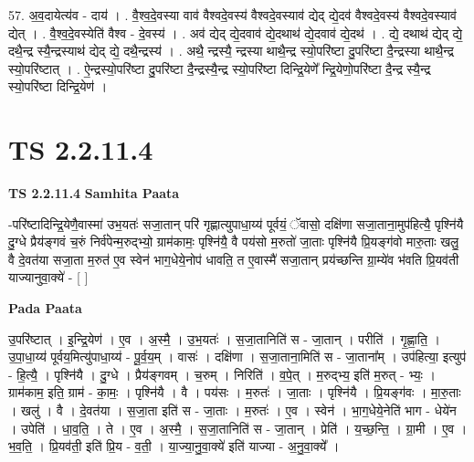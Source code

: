 \documentclass[17pt]{extarticle}
\begin{document}
57. अ॒व॒दायेत्य॑व - दाय॑ । . वै॒श्व॒दे॒वस्या वाव॑ वैश्वदे॒वस्य॑ वैश्वदे॒वस्याव॑ द्येद् द्ये॒दव॑ वैश्वदे॒वस्य॑ वैश्वदे॒वस्याव॑ द्येत् । . वै॒श्व॒दे॒वस्येति॑ वैश्व - दे॒वस्य॑ । . अव॑ द्येद् द्ये॒दवाव॑ द्ये॒दथाथ॑ द्ये॒दवाव॑ द्ये॒दथ॑ । . द्ये॒ दथाथ॑ द्येद् द्ये॒ दथै॒न्द्र स्यै॒न्द्रस्याथ॑ द्येद् द्ये॒ दथै॒न्द्रस्य॑ । . अथै॒ न्द्रस्यै॒ न्द्रस्या थाथै॒न्द्र स्यो॒परि॑ष्टा दु॒परि॑ष्टा दै॒न्द्रस्या थाथै॒न्द्र स्यो॒परि॑ष्टात् । . ऐ॒न्द्रस्यो॒परि॑ष्टा दु॒परि॑ष्टा दै॒न्द्रस्यै॒न्द्र स्यो॒परि॑ष्टा दिन्द्रि॒येणे᳚ न्द्रि॒येणो॒परि॑ष्टा 
दै॒न्द्र स्यै॒न्द्र स्यो॒परि॑ष्टा दिन्द्रि॒येण॑ । \newline
\pagebreak
{}
\section*{ TS 2.2.11.4 }

\textbf{TS 2.2.11.4 } \newline
\textbf{Samhita Paata} \newline

-परि॑ष्टादिन्द्रि॒येणै॒वास्मा॑ उभ॒यतः॑ सजा॒तान् परि॑ गृह्णात्युपाधा॒य्य॑ पूर्वयं॒ ॅवासो॒ दक्षि॑णा सजा॒ताना॒मुप॑हित्यै॒ पृश्नि॑यै दु॒ग्धे प्रैय॑ङ्गवं च॒रुं निर्व॑पेन्म॒रुद्भ्यो॒ ग्राम॑कामः॒ पृश्नि॑यै॒ वै पय॑सो म॒रुतो॑ जा॒ताः पृश्नि॑यै प्रि॒यङ्ग॑वो मारु॒ताः खलु॒ वै दे॒वत॑या सजा॒ता म॒रुत॑ ए॒व स्वेन॑ भाग॒धेये॒नोप॑ धावति॒ त ए॒वास्मै॑ सजा॒तान् प्रय॑च्छन्ति ग्रा॒म्ये॑व भ॑वति प्रि॒यव॑ती याज्यानुवा॒क्ये॑ - [  ] \newline

\textbf{Pada Paata} \newline

उ॒परि॑ष्टात् । इ॒न्द्रि॒येण॑ । ए॒व । अ॒स्मै॒ । उ॒भ॒यतः॑ । स॒जा॒तानिति॑ स - जा॒तान् । परीति॑ । गृ॒ह्णा॒ति॒ । उ॒पा॒धा॒य्य॑ पूर्वय॒मित्यु॑पाधा॒य्य॑ - पू॒र्व॒य॒म् । वासः॑ । दक्षि॑णा । स॒जा॒ताना॒मिति॑ स - जा॒ताना᳚म् । उप॑हित्या॒ इत्युप॑ - हि॒त्यै॒ । पृश्नि॑यै । दु॒ग्धे । प्रैय॑ङ्गवम् । च॒रुम् । निरिति॑ । व॒पे॒त् । म॒रुद्भ्य॒ इति॑ म॒रुत् - भ्यः॒ । ग्राम॑काम॒ इति॒ ग्राम॑ - का॒मः॒ । पृश्नि॑यै । वै । पय॑सः । म॒रुतः॑ । जा॒ताः । पृश्नि॑यै । प्रि॒यङ्ग॑वः । मा॒रु॒ताः । खलु॑ । वै । दे॒वत॑या । स॒जा॒ता इति॑ स - जा॒ताः । म॒रुतः॑ । ए॒व । स्वेन॑ । भा॒ग॒धेये॒नेति॑ भाग - धेये॑न । उपेति॑ । धा॒व॒ति॒ । ते । ए॒व । अ॒स्मै॒ । स॒जा॒तानिति॑ स - जा॒तान् । प्रेति॑ । य॒च्छ॒न्ति॒ । ग्रा॒मी । ए॒व । भ॒व॒ति॒ । प्रि॒यव॑ती॒ इति॑ प्रि॒य - व॒ती॒ । या॒ज्या॒नु॒वा॒क्ये॑ इति॑ याज्या - अ॒नु॒वा॒क्ये᳚ ।  \newline
\end{document}
